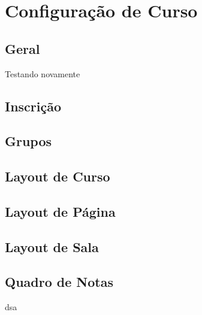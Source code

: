 \chapter{Configuração de Curso}

\section{Geral}

Testando novamente

\section{Inscrição}

\section{Grupos}

\section{Layout de Curso}

\section{Layout de Página}

\section{Layout de Sala}

\section{Quadro de Notas}
dsa
